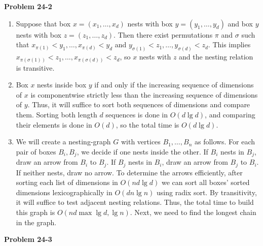 \documentclass{article}
\begin{document}
\noindent\textbf{Problem 24-2}\\
\begin{enumerate}
\item Suppose that box $x = (x_1, \ldots, x_d)$ nests with box $y = (y_1, \ldots, y_d)$ and box $y$ nests with box $z = (z_1, \ldots, z_d)$.  Then there exist permutations $\pi$ and $\sigma$ such that $x_{\pi(1)} < y_1, \ldots, x_{\pi(d)} < y_d$ and $y_{\sigma(1)} < z_1, \ldots, y_{\sigma(d)} < z_d$.  This implies $x_{\pi(\sigma(1))} < z_1, \ldots, x_{\pi(\sigma(d))} < z_d$, so $x$ nests with $z$ and the nesting relation is transitive. \\

\item Box $x$ nests inside box $y$ if and only if the increasing sequence of dimensions of $x$ is componentwise strictly less than the increasing sequence of dimensions of $y$.  Thus, it will suffice to sort both sequences of dimensions and compare them.  Sorting both length $d$ sequences is done in $O(d \lg d)$, and comparing their elements is done in $O(d)$, so the total time is $O(d \lg d)$. \\

\item We will create a nesting-graph $G$ with vertices $B_1, \ldots, B_n$ as follows.  For each pair of boxes $B_i, B_j$, we decide if one nests inside the other.  If $B_i$ nests in $B_j$, draw an arrow from $B_i$ to $B_j$.  If $B_j$ nests in $B_i$, draw an arrow from $B_j$ to $B_i$.  If neither nests, draw no arrow.  To determine the arrows efficiently, after sorting each list of dimensions in $O(nd\lg d)$ we can sort all boxes' sorted dimensions lexicographically in $O(dn\lg n)$ using radix sort.  By transitivity, it will suffice to test adjacent nesting relations.  Thus, the total time to build this graph is $O(nd \max{\lg d, \lg n})$.  Next, we need to find the longest chain in the graph.  \\
\end{enumerate}

\noindent\textbf{Problem 24-3}\\
\end{document}

